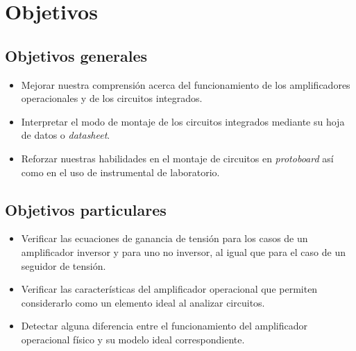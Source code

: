 \section{Objetivos}

\subsection{Objetivos generales}

\begin{itemize}
    \item Mejorar nuestra comprensión acerca del funcionamiento de los
    amplificadores operacionales y de los circuitos integrados.
    \item Interpretar el modo de montaje de los circuitos integrados mediante
    su hoja de datos o \textit{datasheet}.
    \item Reforzar nuestras habilidades en el montaje de circuitos en 
    \textit{protoboard} así como en el uso de instrumental de laboratorio.
\end{itemize}

\subsection{Objetivos particulares}

\begin{itemize}
    \item Verificar las ecuaciones de ganancia de tensión para los casos de un
    amplificador inversor y para uno no inversor, al igual que para el caso de
    un seguidor de tensión.
    \item Verificar las características del amplificador operacional que 
    permiten considerarlo como un elemento ideal al analizar circuitos.
    \item Detectar alguna diferencia entre el funcionamiento del amplificador 
    operacional físico y su modelo ideal correspondiente.
\end{itemize}

